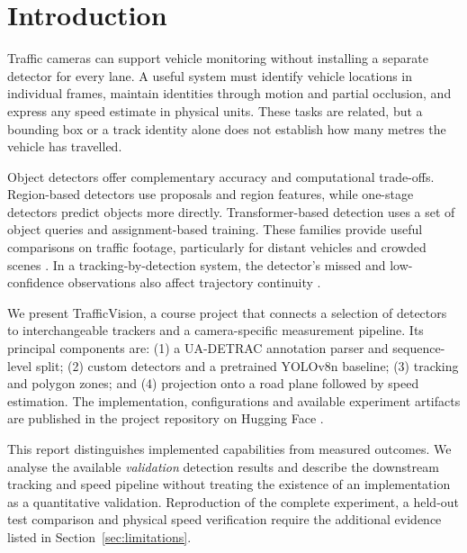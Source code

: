 \section{Introduction}
\label{sec:introduction}
Traffic cameras can support vehicle monitoring without installing a separate detector for every lane. A useful system must identify vehicle locations in individual frames, maintain identities through motion and partial occlusion, and express any speed estimate in physical units. These tasks are related, but a bounding box or a track identity alone does not establish how many metres the vehicle has travelled.

Object detectors offer complementary accuracy and computational trade-offs. Region-based detectors use proposals and region features, while one-stage detectors predict objects more directly. Transformer-based detection uses a set of object queries and assignment-based training. These families provide useful comparisons on traffic footage, particularly for distant vehicles and crowded scenes \cite{rcnn,fast,faster,rtdetr}. In a tracking-by-detection system, the detector's missed and low-confidence observations also affect trajectory continuity \cite{bytetrack}.

We present TrafficVision, a course project that connects a selection of detectors to interchangeable trackers and a camera-specific measurement pipeline. Its principal components are: (1) a UA-DETRAC annotation parser and sequence-level split; (2) custom detectors and a pretrained YOLOv8n baseline; (3) tracking and polygon zones; and (4) projection onto a road plane followed by speed estimation. The implementation, configurations and available experiment artifacts are published in the project repository on Hugging Face \cite{repository}.

This report distinguishes implemented capabilities from measured outcomes. We analyse the available \emph{validation} detection results and describe the downstream tracking and speed pipeline without treating the existence of an implementation as a quantitative validation. Reproduction of the complete experiment, a held-out test comparison and physical speed verification require the additional evidence listed in Section~\ref{sec:limitations}.
